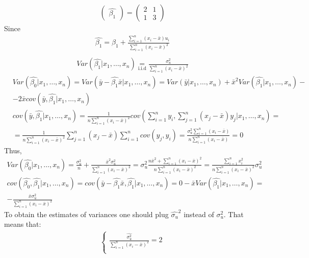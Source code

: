 \documentclass[a4paper]{article}
\newcommand{\summa}{\sum_{i=1}^n}
\begin{document}
\begin{enumerate}[(a)]
\begin{align*}
\begin{pmatrix}
	\hat{\beta_1}
	\end{pmatrix} = \begin{pmatrix}
	2 & 1\\
	1 & 3
	\end{pmatrix}
	\end{align*}
	Since
	\begin{align*}
	\hat{\beta_1} = \beta_1 + \frac{\summa (x_i - \bar{x})u_i}{\summa (x_i - \bar{x})^2}\\
	\end{align*}
	\begin{align*}
	Var (\hat{\beta_1}|x_1, \dots, x_n) \underset{\text{i.i.d}}{=} \frac{\sigma^2_u}{\summa (x_i - \bar{x})^2}
	\end{align*}
	\begin{align*}
	&Var(\hat{\beta_0}|x_1, \dots, x_n) = Var(\bar{y} - \hat{\beta_1}\bar{x}|x_1, \dots, x_n) = Var(\bar{y}|x_1, \dots, x_n) + \bar{x}^2Var(\hat{\beta_1}|x_1, \dots, x_n) -\\
	&- 2\bar{x}cov(\bar{y}, \hat{\beta_1}|x_1, \dots, x_n)
	\end{align*}
	\begin{align*}
	&cov(\bar{y}, \hat{\beta_1}|x_1, \dots, x_n) = \frac{1}{n\summa (x_i - \bar{x})^2} cov \left(\summa y_i, \sum_{j=1}^n (x_j - \bar{x})y_j\bigg|x_1, \dots, x_n\right) = \\
	&=\frac{1}{n\summa (x_i - \bar{x})^2} \sum_{j=1}^n(x_j - \bar{x})\summa cov(y_j, y_i) = \frac{\sigma^2_u \summa (x_i - \bar{x})}{n\summa(x_i - \bar{x})} = 0
	\end{align*}
	Thus, 
	\begin{align*}
	Var(\hat{\beta_0}|x_1, \dots, x_n) = \frac{\sigma^2_u}{n} + \frac{\bar{x}^2\sigma^2_u}{\summa(x_i - \bar{x})^2} = \sigma^2_u\frac{n\bar{x}^2 + \summa(x_i - \bar{x})^2}{n\summa(x_i - \bar{x})^2} = \frac{\summa x_i^2}{n\summa(x_i - \bar{x})^2}\sigma_u^2
	\end{align*}
	\begin{align*}
	cov(\hat{\beta_0}, \hat{\beta_1}|x_1, \dots, x_n) = cov(\bar{y} - \hat{\beta_1}\bar{x}, \hat{\beta_1}|x_1, \dots, x_n) = 0 - \bar{x}Var(\hat{\beta_1}|x_1, \dots, x_n) =\\ -\frac{\bar{x} \sigma^2_u}{\summa (x_i - \bar{x})^2}
	\end{align*}
	To obtain the estimates of variances one should plug $\hat{\sigma_u}^2$ instead of $\sigma^2_u$. That means that:
	\begin{align*}
	\begin{cases}
	\frac{\hat{\sigma^2_u}}{\summa (x_i - \bar{x})^2} = 2\\

\end{cases}
\end{align*}
\end{enumerate}
\end{document}

